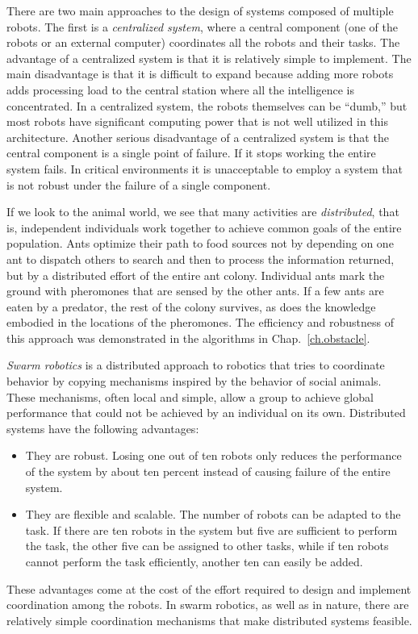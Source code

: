 There are two main approaches to the design of systems composed of multiple robots. The first is a \textit{centralized system}, where a central component (one of the robots or an external computer) coordinates all the robots and their tasks. The advantage of a centralized system is that it is relatively simple to implement. The main disadvantage is that it is difficult to expand because adding more robots adds processing load to the central station where all the intelligence is concentrated. In a centralized system, the robots themselves can be ``dumb,'' but most robots have significant computing power that is not well utilized in this architecture. Another serious disadvantage of a centralized system is that the central component is a single point of failure. If it stops working the entire system fails. In critical environments it is unacceptable to employ a system that is not robust under the failure of a single component.

If we look to the animal world, we see that many activities are \emph{distributed}, that is, independent individuals work together to achieve common goals of the entire population. Ants optimize their path to food sources not by depending on one ant to dispatch others to search and then to process the information returned, but by a distributed effort of the entire ant colony. Individual ants mark the ground with pheromones that are sensed by the other ants. If a few ants are eaten by a predator, the rest of the colony survives, as does the knowledge embodied in the locations of the pheromones. The efficiency and robustness of this approach was demonstrated in the algorithms in Chap.~\ref{ch.obstacle}.

\emph{Swarm robotics} is a distributed approach to robotics that tries to coordinate behavior by copying mechanisms inspired by the behavior of social animals. These mechanisms, often local and simple, allow a group to achieve global performance that could not be achieved by an individual on its own. Distributed systems have the following advantages:
\begin{itemize}
\item They are robust. Losing one out of ten robots only reduces the performance of the system by about ten percent instead of causing failure of the entire system.
\item They are flexible and scalable. The number of robots can be adapted to the task. If there are ten robots in the system but five are sufficient to perform the task, the other five can be assigned to other tasks, while if ten robots cannot perform the task efficiently, another ten can easily be added.
\end{itemize}
These advantages come at the cost of the effort required to design and implement coordination among the robots. In swarm robotics, as well as in nature, there are relatively simple coordination mechanisms that make distributed systems feasible.


